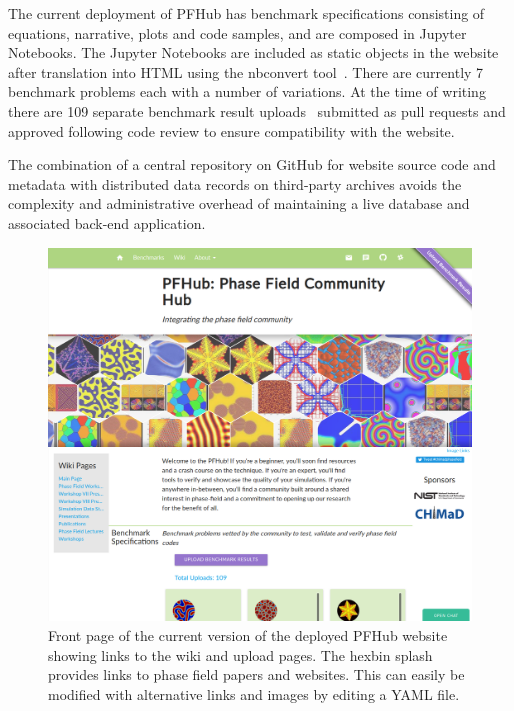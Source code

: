 \documentclass{jors}
\begin{document}
The current deployment of PFHub has benchmark specifications
consisting of equations, narrative, plots and code samples, and are
composed in Jupyter Notebooks. The Jupyter Notebooks are included as
static objects in the website after translation into HTML using the
nbconvert tool~\cite{jupyter}. There are currently 7 benchmark
problems each with a number of variations. At the time of writing
there are 109 separate benchmark result uploads~\cite{pfhub} submitted
as pull requests and approved following code review to ensure
compatibility with the website.

The combination of a central repository on GitHub for website source
code and metadata with distributed data records on third-party
archives avoids the complexity and administrative overhead of
maintaining a live database and associated back-end application.

\begin{figure}
  \includegraphics[width=\textwidth]{pfhub_frontpage.png}
  \caption{Front page of the current version of the deployed PFHub
    website showing links to the wiki and upload pages. The hexbin
    splash provides links to phase field papers and websites. This can
    easily be modified with alternative links and images by editing a
    YAML file.}  \centering
  \label{fig:pfhub_frontpage}
\end{figure}
\end{document}
